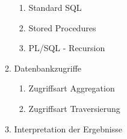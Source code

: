 \begin{enumerate}
\begin{enumerate}[label*=\arabic*.]
\begin{enumerate}[label*=\arabic*.]
            	\item Standard \ac{SQL}
            	\item Stored Procedures
            	\item PL/SQL - Recursion
            \end{enumerate}
            \item Datenbankzugriffe
            \begin{enumerate}[label*=\arabic*.]
            	\item Zugriffsart Aggregation
            	\item Zugriffsart Traversierung
            \end{enumerate}
            \item Interpretation der Ergebnisse
        \end{enumerate}
    \end{enumerate}

